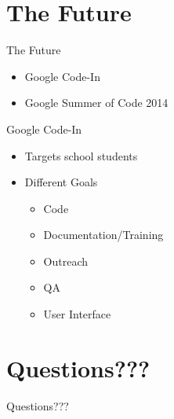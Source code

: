 \documentclass{beamer}
\begin{document}
\section{The Future}
\begin{frame}{The Future}
\pause
\begin{itemize}
\item Google Code-In
\item Google Summer of Code 2014
\end{itemize}
\end{frame}

\begin{frame}{Google Code-In}
\pause
\begin{itemize}
\item Targets school students
\item Different Goals
\pause
\begin{itemize}
\item Code
\item Documentation/Training
\item Outreach
\item QA
\item User Interface
\end{itemize}
\end{itemize}
\end{frame}

\section{Questions???}
\pause
\begin{frame}{Questions???}
\end{frame}
\end{document}
